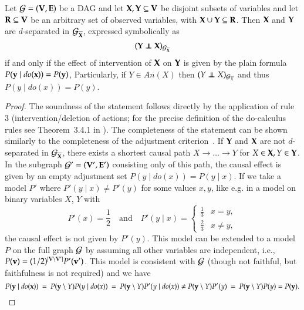 %
%

%
%
%
%

\begin{proposition}\label{prep:observation:is:causal}
Let ${\cal G}=({\bf V},{\bf E})$ be a DAG and let ${\bf X},{\bf Y}\subseteq {\bf V}$  
be disjoint subsets of variables and 
let ${\bf R} \subseteq {\bf V}$ be an arbitrary set of observed variables, 
with $ {\bf X}\cup {\bf Y} \subseteq{\bf R}$.
Then %
${\bf X}$ and ${\bf Y}$ are $d$-separated in 
${\cal G}_{\overline{{\bf X}}}$, expressed symbolically as 
\begin{equation}\label{eq:plain:condition}
  (\bY \independent \bX)_{\cG_{\overline{\bX}}}
\end{equation}
if and only if 
the effect of intervention  of ${\bf X}$ on ${\bf Y}$ %
	is given by  the plain formula $P({\bf y} \mid \textit{do}({\bf x})) = P({\bf y})$, 
Particularly, if $Y \in \textit{An}(X)$ then $(Y \independent X)_{\cG_{\overline{X}}}$
and thus $P(y \mid \textit{do}(x)) = P(y)$.
%
%
\end{proposition}
\begin{proof}
%
The soundness of the  statement %
follows directly by the application of rule 3 
(intervention/deletion of actions; 
for the precise definition of the do-calculus rules see Theorem~3.4.1 in \citep{Pearl2009}). 
The completeness of the statement can be shown similarly to the completeness of the adjustment criterion~\cite{ShpitserVR2010}. If ${\bf Y}$ and ${\bf X}$ are not $ d $-separated in ${\cal G}_{\overline{{\bf X}}}$, 
there exists a shortest causal path $ X \to \ldots \to Y $ for $ X \in {\bf X},Y \in {\bf Y} $. 
In the subgraph $ {\cal G}' = ({\bf V}', {\bf E}')$ 
consisting only of this path, 
the causal effect is given by an empty adjustment set 
$P(y\mid \textit{do}(x)) = P(y\mid x)$. 
If we take a model $P' $ where $P'(y \mid x) \neq P'(y) $ 
for some values $ x, y $, 
like e.g. in  a model on binary variables $ X$, $Y $  with 
\[
  P'(x) = \frac{1}{2}\quad  \text{and} \quad 
  P'(y\mid x) = \begin{cases}
  \frac{1}{3}& x = y,\\
  \frac{2}{3}& x \neq y,
  \end{cases}
\]
the causal effect is not given by $P'(y)$.
This model can be extended 
to a model $ P $ on the full graph $ {\cal G} $ by assuming all other variables 
are independent, i.e., $ P({\bf v}) = (1/2)^{|{\bf V} \setminus {\bf V}'|} P'({\bf v}') $. 
This model is consistent with $ {\cal G} $ (though not faithful, but faithfulness is not required) 
and we have
\[
  P({\bf y}\mid \textit{do}({\bf x})) \ = \  P({\bf y} \setminus Y) P(y\mid \textit{do}(x)) \ = \  P({\bf y} \setminus Y) 
  P'(y\mid \textit{do}(x)) \neq P({\bf y} \setminus Y) P'(y) \ = \ P({\bf y} \setminus Y) P(y) = P({\bf y}).
\]
\end{proof}

